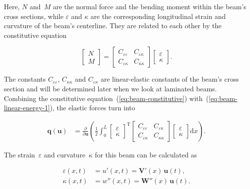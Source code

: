 Here, $N$ and~$M$ are the normal force and the bending moment within the beam's cross sections, while $\varepsilon$ and $\kappa$ are the corresponding longitudinal strain and curvature of the beam's centerline. They are related to each other by the constitutive equation

\begin{equation}
\begin{bmatrix}
N\\
M
\end{bmatrix}
=
\begin{bmatrix}
C_{\varepsilon\varepsilon} & C_{\varepsilon\kappa}\\
C_{\varepsilon\kappa} & C_{\kappa\kappa}
\end{bmatrix}
\begin{bmatrix}
\varepsilon\\
\kappa
\end{bmatrix}.\label{eq:beam-constitutive}
\end{equation}

The constants $C_{\varepsilon\varepsilon}$, $C_{\kappa\kappa}$ and $C_{\varepsilon\kappa}$ are linear-elastic constants of the beam's cross section and will be determined later when we look at laminated beams. Combining the constitutive equation~(\ref{eq:beam-constitutive}) with~(\ref{eq:beam-linear-energy-1}), the elastic forces turn into

\begin{align}
\boldsymbol{q}(\boldsymbol{u}) &= \frac{\partial}{\partial \boldsymbol{u}}\left(\frac{1}{2}\int_0^L
\begin{bmatrix}
\varepsilon\\
\kappa
\end{bmatrix}^\mathrm{T}
\begin{bmatrix}
C_{\varepsilon\varepsilon} & C_{\varepsilon\kappa}\\
C_{\varepsilon\kappa} & C_{\kappa\kappa}
\end{bmatrix}
\begin{bmatrix}
\varepsilon\\
\kappa
\end{bmatrix}
\mathrm{d}x\right).\label{eq:elements:beam:total_energy_intermediate}
\end{align}

The strain~$\varepsilon$ and curvature~$\kappa$ for this beam can be calculated as

\begin{align}
\varepsilon(x,t) &= u'(x,t) = \boldsymbol{V}'(x)\,\boldsymbol{u}(t),\\
\kappa(x,t) &= w''(x,t) = \boldsymbol{W}''(x)\,\boldsymbol{u}(t).
\end{align}

